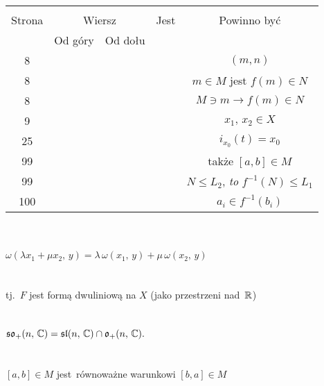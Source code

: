 \documentclass[a4paper,11pt]{article}
\begin{document}







\begin{center}

  \begin{tabular}{|c|c|c|c|c|}
    \hline
    & \multicolumn{2}{c|}{} & & \\
    Strona & \multicolumn{2}{c|}{Wiersz} & Jest
                              & Powinno być \\ \cline{2-3}
    & Od góry & Od dołu & & \\
    \hline
    8   & & & & $( m, n )$ \\
    8   & & & & $m \in M$ jest $f( m ) \in N$ \\
    8   & & & & $M \ni m \to f( m ) \in N$ \\
    9   & & & & $x_{ 1 }, \, x_{ 2 } \in X$ \\
    25  & & & & $i_{ x_{ 0 } }( t ) = x_{ 0 }$ \\
    99  & & & & także $[ a, b ] \in M$ \\
    99  & & & & $N \leq L_{ 2 }$, \textit{to} $f^{ -1 }( N ) \leq L_{ 1 }$ \\
    100 & & & & $a_{ i } \in f^{ -1 }( b_{ i } )$ \\
    \hline
  \end{tabular}

\end{center}


\noindent
{} \\
\Jest \\
\Powin $\omega( \lambda x_{ 1 } + \mu x_{ 2 },\, y ) = \lambda \, \omega( x_{
  1 },\, y ) + \mu \, \omega( x_{ 2 },\, y )$ \\
 \\
\Jest \\
\Powin tj.~$F$ jest formą dwuliniową na $X$ (jako przestrzeni nad~$\mathbb{R}$) \\
 \\
\Jest \\
\Powin $\mathfrak{so}_{ + }( n,\, \mathbb{C} ) = \mathfrak{sl}( n,\, \mathbb{C} ) \cap
\mathfrak{o}_{ + }( n,\, \mathbb{C} ) \textrm{.}$ \\
 \\
\Jest \\
\Powin $[ a, b ] \in M$ jest~równoważne warunkowi $[ b, a ] \in M$ \\
\end{document}
